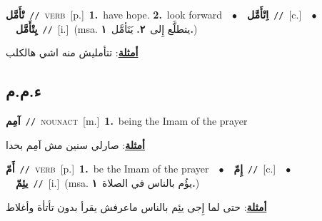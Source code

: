 \documentclass[10pt,a4paper,twoside]{article} %
\begin{document}
\begin{multicols}{2}
{\setlength\topsep{0pt}\textbf{\foreignlanguage{arabic}{تْأَمَّل}}\ {\color{gray}\texttt{//}\color{black}}\ \textsc{verb}\ [p.]\ \textbf{1.}~have hope.  \textbf{2.}~look forward\ \ $\bullet$\ \ \setlength\topsep{0pt}\textbf{\foreignlanguage{arabic}{اِتْأَمَّل}}\ {\color{gray}\texttt{//}\color{black}}\ [c.]\ \ $\bullet$\ \ \setlength\topsep{0pt}\textbf{\foreignlanguage{arabic}{يِتْأَمَّل}}\ {\color{gray}\texttt{//}\color{black}}\ [i.]\ \color{gray}(msa. \foreignlanguage{arabic}{يتطلَّع إِلى}~\foreignlanguage{arabic}{\textbf{٢.}}  \foreignlanguage{arabic}{يَتَأمَّل}~\foreignlanguage{arabic}{\textbf{١.}})\color{black}\  \begin{flushright}\color{gray}\foreignlanguage{arabic}{\textbf{\underline{\foreignlanguage{arabic}{أمثلة}}}: تتأمليش منه اشي هالكلب}\end{flushright}\color{black}} \vspace{2mm}

\vspace{-3mm}
\subsection*{\color{blue}\foreignlanguage{arabic}{ء.م.م}\color{blue}{}} 

{\setlength\topsep{0pt}\textbf{\foreignlanguage{arabic}{آمِم}}\ {\color{gray}\texttt{//}\color{black}}\ \textsc{noun\textunderscore act}\ [m.]\ \textbf{1.}~being the Imam of the prayer\  \begin{flushright}\color{gray}\foreignlanguage{arabic}{\textbf{\underline{\foreignlanguage{arabic}{أمثلة}}}: صارلي سنين مش آمِم بحدا}\end{flushright}\color{black}} \vspace{2mm}

{\setlength\topsep{0pt}\textbf{\foreignlanguage{arabic}{أَمّ}}\ {\color{gray}\texttt{//}\color{black}}\ \textsc{verb}\ [p.]\ \textbf{1.}~be the Imam of the prayer\ \ $\bullet$\ \ \setlength\topsep{0pt}\textbf{\foreignlanguage{arabic}{إِمّ}}\ {\color{gray}\texttt{//}\color{black}}\ [c.]\ \ $\bullet$\ \ \setlength\topsep{0pt}\textbf{\foreignlanguage{arabic}{يئِمّ}}\ {\color{gray}\texttt{//}\color{black}}\ [i.]\ \color{gray}(msa. \foreignlanguage{arabic}{يؤُم بالناس في الصلاة}~\foreignlanguage{arabic}{\textbf{١.}})\color{black}\  \begin{flushright}\color{gray}\foreignlanguage{arabic}{\textbf{\underline{\foreignlanguage{arabic}{أمثلة}}}: حتى لما إِجى يئِم بالناس ماعرفش يقرأ بدون تأتأة وأغلاط}\end{flushright}\color{black}} \vspace{2mm}


\end{multicols}
\end{document}
